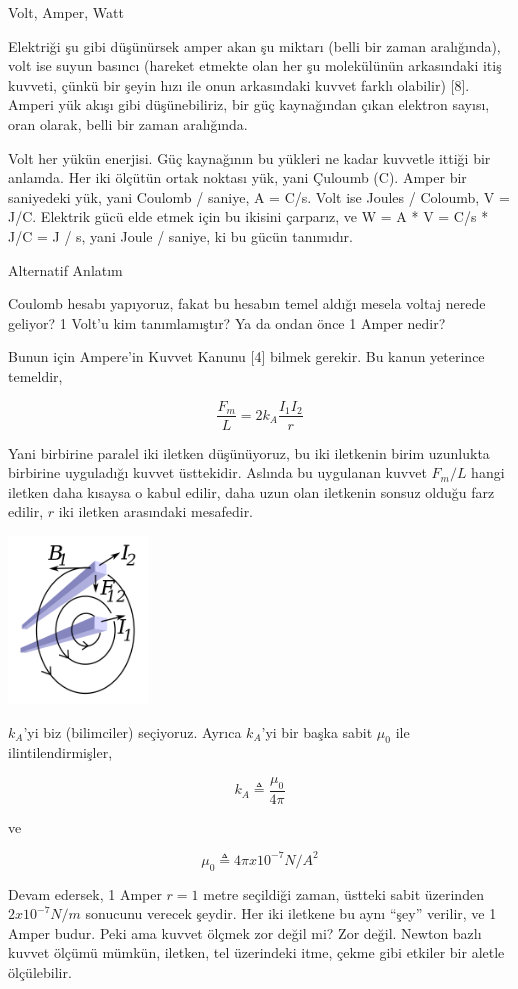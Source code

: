 \documentclass[12pt,fleqn]{article}\usepackage{../../common}
\begin{document}
Volt, Amper, Watt

Elektriği şu gibi düşünürsek amper akan şu miktarı (belli bir zaman
aralığında), volt ise suyun basıncı (hareket etmekte olan her şu
molekülünün arkasındaki itiş kuvveti, çünkü bir şeyin hızı ile onun
arkasındaki kuvvet farklı olabilir) [8]. Amperi yük akışı gibi
düşünebiliriz, bir güç kaynağından çıkan elektron sayısı, oran olarak,
belli bir zaman aralığında. 

Volt her yükün enerjisi. Güç kaynağının bu yükleri ne kadar kuvvetle
ittiği bir anlamda. Her iki ölçütün ortak noktası yük, yani Çuloumb
(C). Amper bir saniyedeki yük, yani Coulomb / saniye, A = C/s. Volt ise
Joules / Coloumb, V = J/C. Elektrik gücü elde etmek için bu ikisini
çarparız, ve W = A * V = C/s * J/C = J / s, yani Joule / saniye, ki bu
gücün tanımıdır.

Alternatif Anlatım

Coulomb hesabı yapıyoruz, fakat bu hesabın temel aldığı mesela voltaj
nerede geliyor? 1 Volt'u kim tanımlamıştır? Ya da ondan önce 1 Amper nedir?

Bunun için Ampere'in Kuvvet Kanunu [4] bilmek gerekir. Bu kanun yeterince
temeldir,

$$ \frac{F_m}{L} = 2 k_A \frac{I_1I_2}{r}$$

Yani birbirine paralel iki iletken düşünüyoruz, bu iki iletkenin birim
uzunlukta birbirine uyguladığı kuvvet üsttekidir. Aslında bu uygulanan
kuvvet $F_m/L$ hangi iletken daha kısaysa o kabul edilir, daha uzun olan
iletkenin sonsuz olduğu farz edilir, $r$ iki iletken arasındaki mesafedir.

\includegraphics[width=10em]{elecmag_09.png}

$k_A$'yi biz (bilimciler) seçiyoruz. Ayrıca $k_A$'yi bir başka sabit
$\mu_0$ ile ilintilendirmişler,

$$ k_A \triangleq \frac{\mu_0}{4\pi}$$

ve 

$$ \mu_0 \triangleq 4\pi x 10^{-7} N / A^2$$

Devam edersek, 1 Amper $r = 1$ metre seçildiği zaman, üstteki sabit
üzerinden $2 x 10 ^{-7} N/m$ sonucunu verecek şeydir. Her iki iletkene bu
aynı ``şey'' verilir, ve 1 Amper budur. Peki ama kuvvet ölçmek zor değil
mi? Zor değil. Newton bazlı kuvvet ölçümü mümkün, iletken, tel üzerindeki
itme, çekme gibi etkiler bir aletle ölçülebilir.
\end{document}
